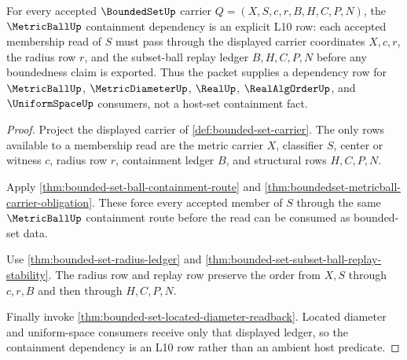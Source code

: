 \begin{theorem}
\label{thm:bounded-set-metric-ball-containment}
For every accepted $\BoundedSetUp$ carrier $Q=(X,S,c,r,B,H,C,P,N)$, the $\MetricBallUp$ containment dependency is an explicit L10 row: each accepted membership read of $S$ must pass through the displayed carrier coordinates $X,c,r$, the radius row $r$, and the subset-ball replay ledger $B,H,C,P,N$ before any boundedness claim is exported. Thus the packet supplies a dependency row for $\MetricBallUp$, $\MetricDiameterUp$, $\RealUp$, $\RealAlgOrderUp$, and $\UniformSpaceUp$ consumers, not a host-set containment fact.
\end{theorem}
\begin{proof}
Project the displayed carrier of \autoref{def:bounded-set-carrier}. The only rows available to a membership read are the metric carrier $X$, classifier $S$, center or witness $c$, radius row $r$, containment ledger $B$, and structural rows $H,C,P,N$.

Apply \autoref{thm:bounded-set-ball-containment-route} and \autoref{thm:boundedset-metricball-carrier-obligation}. These force every accepted member of $S$ through the same $\MetricBallUp$ containment route before the read can be consumed as bounded-set data.

Use \autoref{thm:bounded-set-radius-ledger} and \autoref{thm:bounded-set-subset-ball-replay-stability}. The radius row and replay row preserve the order from $X,S$ through $c,r,B$ and then through $H,C,P,N$.

Finally invoke \autoref{thm:bounded-set-located-diameter-readback}. Located diameter and uniform-space consumers receive only that displayed ledger, so the containment dependency is an L10 row rather than an ambient host predicate.
\end{proof}

